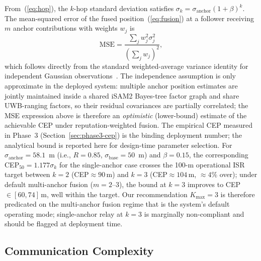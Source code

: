 \documentclass[journal,10pt,twocolumn]{IEEEtran}
\begin{document}
From~(\ref{eq:hop}), the $k$-hop standard deviation satisfies $\sigma_k = \sigma_\text{anchor}(1+\beta)^k$. The mean-squared error of the fused position~(\ref{eq:fusion}) at a follower receiving $m$ anchor contributions with weights $w_j$ is
\begin{equation}
\mathrm{MSE} = \frac{\sum_j w_j^2 \sigma_j^2}{\left(\sum_j w_j\right)^2},
\end{equation}
which follows directly from the standard weighted-average variance identity for independent Gaussian observations~\cite{kay1993estimation}. The independence assumption is only approximate in the deployed system: multiple anchor position estimates are jointly maintained inside a shared iSAM2 Bayes-tree factor graph and share UWB-ranging factors, so their residual covariances are partially correlated; the MSE expression above is therefore an \emph{optimistic} (lower-bound) estimate of the achievable CEP under reputation-weighted fusion. The empirical CEP measured in Phase~3 (Section~\ref{sec:phase3-cep}) is the binding deployment number; the analytical bound is reported here for design-time parameter selection.
For $\sigma_\text{anchor}=58.1$~m (i.e., $R=0.85$, $\sigma_\text{base}=50$~m) and $\beta=0.15$, the corresponding CEP$_{50}=1.177\sigma_k$ for the single-anchor case crosses the 100-m operational ISR target between $k=2$ (CEP$\approx 90$\,m) and $k=3$ (CEP$\approx 104$\,m, $\approx 4\%$ over); under default multi-anchor fusion ($m{=}2$--$3$), the bound at $k=3$ improves to CEP$\in[60,74]$\,m, well within the target. Our recommendation $K_\text{max}{=}3$ is therefore predicated on the multi-anchor fusion regime that is the system's default operating mode; single-anchor relay at $k=3$ is marginally non-compliant and should be flagged at deployment time.

\subsection{Communication Complexity}
\end{document}
